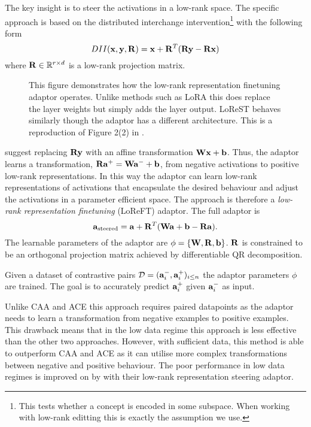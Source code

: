 The key insight is to steer the activations in a low-rank space.
The specific approach is based on the distributed interchange intervention\footnote{This tests whether a concept is encoded in some subspace. When working with low-rank editting this is exactly the assumption we use.} \citep{dii} with the following form
\begin{equation*}
    DII(\mathbf{x},\mathbf{y},\mathbf{R}) = \mathbf{x} + \mathbf{R}^T(\mathbf{R}\mathbf{y} - \mathbf{R}\mathbf{x})
\end{equation*}
where $\mathbf{R} \in \mathbb{R}^{r\times d}$ is a low-rank projection matrix.

\begin{figure}
    \centering
    \captionsetup{width=.9\textwidth}
    
    \caption{This figure demonstrates how the low-rank representation finetuning adaptor \citep{reft} operates. Unlike methods such as LoRA \citep{lora} this does replace the layer weights but simply adds the layer output. LoReST \citep{steering-clear} behaves similarly though the adaptor has a different architecture. This is a reproduction of Figure 2(2) in \citet{reft}.}
     \label{fig:loreft}
\end{figure}

\citet{reft} suggest replacing $\mathbf{R}\mathbf{y}$ with an affine transformation $\mathbf{W}\mathbf{x} + \mathbf{b}$.
Thus, the adaptor learns a transformation, $\mathbf{R}\mathbf{a}^+ = \mathbf{W}\mathbf{a}^- + \mathbf{b}$, from negative activations to positive low-rank representations.
In this way the adaptor can learn low-rank representations of activations that encapsulate the desired behaviour and adjust the activations in a parameter efficient space.
The approach is therefore a \textit{low-rank representation finetuning} (LoReFT) adaptor.
The full adaptor is
\begin{equation}
    \label{eq:loreft}
    \mathbf{a}_\text{steered} = \mathbf{a} + \mathbf{R}^T(\mathbf{W}\mathbf{a} + \mathbf{b} - \mathbf{R}\mathbf{a}).
\end{equation}
The learnable parameters of the adaptor are $\phi = \{\mathbf{W}, \mathbf{R}, \mathbf{b}\}$.
$\mathbf{R}$ is constrained to be an orthogonal projection matrix achieved by differentiable QR decomposition.

Given a dataset of contrastive pairs $\mathcal{D} = (\mathbf{a}_i^-, \mathbf{a}_i^+)_{i\le n}$ the adaptor parameters $\phi$ are trained.
The goal is to accurately predict $\mathbf{a}_i^+$ given $\mathbf{a}_i^-$ as input.

Unlike CAA \citep{caa} and ACE \citep{ace} this approach requires paired datapoints as the adaptor needs to learn a transformation from negative examples to positive examples.
This drawback means that in the low data regime this approach is less effective than the other two approaches.
However, with sufficient data, this method is able to outperform CAA and ACE as it can utilise more complex transformations between negative and positive behaviour.
The poor performance in low data regimes is improved on by \citet{steering-clear} with their low-rank representation steering adaptor.

